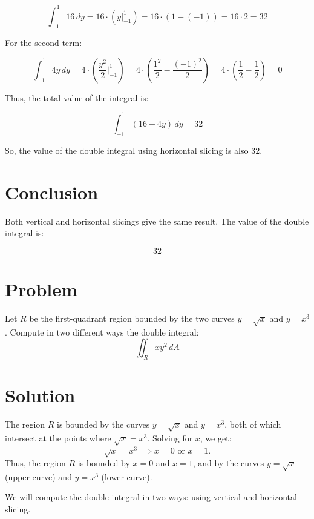 \documentclass[11pt]{article}
\begin{document}
\[
\int_{-1}^1 16 \, dy = 16 \cdot (y \bigg|_{-1}^1) = 16 \cdot (1 - (-1)) = 16 \cdot 2 = 32
\]

For the second term:

\[
\int_{-1}^1 4y \, dy = 4 \cdot \left( \frac{y^2}{2} \bigg|_{-1}^1 \right) = 4 \cdot ( \frac{1^2}{2} - \frac{(-1)^2}{2} ) = 4 \cdot ( \frac{1}{2} - \frac{1}{2} ) = 0
\]

Thus, the total value of the integral is:

\[
\int_{-1}^1 (16 + 4y) \, dy = 32
\]

So, the value of the double integral using horizontal slicing is also \( 32 \).

\newpage

\section{Conclusion}

Both vertical and horizontal slicings give the same result. The value of the double integral is:

\[
\boxed{32}
\]




\maketitle

\newpage

\section{Problem}
Let \( R \) be the first-quadrant region bounded by the two curves \( y = \sqrt{x} \) and \( y = x^3 \). Compute in two different ways the double integral:
\[
\iint_R x y^2 \, dA
\]

\newpage

\section{Solution}

The region \( R \) is bounded by the curves \( y = \sqrt{x} \) and \( y = x^3 \), both of which intersect at the points where \( \sqrt{x} = x^3 \). Solving for \( x \), we get:
\[
\sqrt{x} = x^3 \implies x = 0 \text{ or } x = 1.
\]
Thus, the region \( R \) is bounded by \( x = 0 \) and \( x = 1 \), and by the curves \( y = \sqrt{x} \) (upper curve) and \( y = x^3 \) (lower curve).

We will compute the double integral in two ways: using vertical and horizontal slicing.
\end{document}
